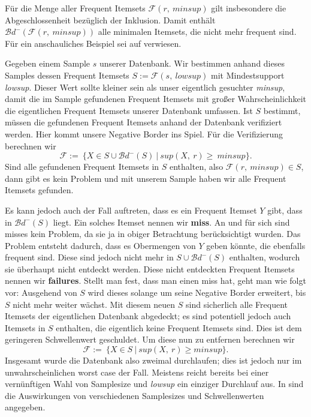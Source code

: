 Für die Menge aller Frequent Itemsets \(\mathcal{F}(r,\ minsup)\) gilt insbesondere
die Abgeschlossenheit bezüglich der Inklusion. Damit enthält \(\mathcal{B}d^{-}
(\mathcal{F}(r,\ minsup))\) alle minimalen Itemsets, die nicht mehr frequent sind.
Für ein anschauliches Beispiel sei auf \citet{Toi96} verwiesen.

Gegeben einem Sample \(s\) unserer Datenbank. Wir bestimmen anhand dieses Samples dessen
Frequent Itemsets \(S:=\mathcal{F}(s,\ lowsup)\) mit Mindestsupport \textit{lowsup}.
Dieser Wert sollte kleiner sein als unser eigentlich gesuchter \textit{minsup}, damit
die im Sample gefundenen Frequent Itemsets mit großer Wahrscheinlichkeit die
eigentlichen Frequent Itemsets unserer Datenbank umfassen. Ist \(S\) bestimmt,
müssen die gefundenen Frequent Itemsets anhand der Datenbank verifiziert werden.
Hier kommt unsere Negative Border ins Spiel. Für die Verifizierung berechnen wir
\[\mathcal{F}:=\ \{X\in S\cup \mathcal{B}d^{-}(S)\ |\ sup(X,\ r) \geq\ minsup\}.\]
Sind alle gefundenen Frequent Itemsets in \(S\) enthalten, also \(\mathcal{F}(r,\ 
minsup) \in S\), dann gibt es kein Problem und mit unserem Sample haben wir alle
Frequent Itemsets gefunden.

Es kann jedoch auch der Fall auftreten, dass es ein Frequent Itemset \(Y\) gibt,
dass in \(\mathcal{B}d^{-}(S)\) liegt. Ein solches Itemset nennen wir \textbf{miss}.
An und für sich sind misses kein Problem, da sie ja in obiger Betrachtung berücksichtigt
wurden. Das Problem entsteht dadurch, dass es Obermengen von \(Y\) geben könnte, die 
ebenfalls frequent sind. Diese sind jedoch nicht mehr in \(S\cup \mathcal{B}d^{-}(S)\)
enthalten, wodurch sie überhaupt nicht entdeckt werden. Diese nicht entdeckten 
Frequent Itemsets nennen wir \textbf{failures}. Stellt man fest, dass man einen
miss hat, geht man wie folgt vor: Ausgehend von \(S\) wird dieses solange um seine
Negative Border erweitert, bis \(S\) nicht mehr weiter wächst. Mit diesem neuen \(S\)
sind sicherlich alle Frequent Itemsets der eigentlichen Datenbank abgedeckt; es sind
potentiell jedoch auch Itemsets in \(S\) enthalten, die eigentlich keine Frequent
Itemsets sind. Dies ist dem geringeren Schwellenwert geschuldet. Um diese nun zu 
entfernen berechnen wir 
\[\mathcal{F}:=\ \{X\in S\ |\ sup(X,\ r)\geq minsup\}.\]
Insgesamt wurde die Datenbank also zweimal durchlaufen; dies ist jedoch nur im
unwahrscheinlichen worst case der Fall. Meistens reicht bereits bei einer vernünftigen
Wahl von Samplesize und \textit{lowsup} ein einziger Durchlauf aus. In \citet{Toi96}
sind die Auswirkungen von verschiedenen Samplesizes und Schwellenwerten angegeben.

